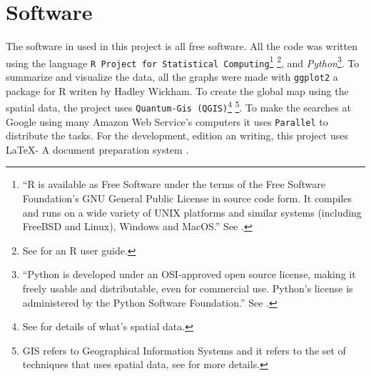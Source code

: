 \chapter{Software}
\label{chap_software}

\noindent The software in used in this project is all free software. All the code was written using the  language \texttt{R Project for Statistical Computing}\footnote{``R is available as Free Software under the terms of the Free Software Foundation’s GNU General Public License in source code form. It compiles and runs on a wide variety of UNIX platforms and similar systems (including FreeBSD and Linux), Windows and MacOS.'' See \cite{r_pagina}.
} \footnote{See \cite{R:Bloomfield:2014} for an R user guide.}, and \textit{Python}\footnote{``Python is developed under an OSI-approved open source license, making it freely usable and distributable, even for commercial use. Python's license is administered by the Python Software Foundation.'' See \cite{python_about}.}. To summarize and visualize the data, all the graphs were made with \texttt{ggplot2} \parencite{wickham_ggplot} a package for R writen by Hadley Wickham. To create the global map using the spatial data, the project uses \texttt{Quantum-Gis (QGIS)}\footnote{See \cite{clifford1981} for details of what's spatial data.} \footnote{GIS refers to Geographical Information Systems and it refers to the set of techniques that uses spatial data, see \cite{GIS05}  for more details.}. To make the searches at Google using many Amazon Web Service's computers it uses \texttt{Parallel} \parencite{Tange2011a} to distribute the tasks. For the development, edition an writing, this project uses \LaTeX - A document preparation system \cite{latex}.